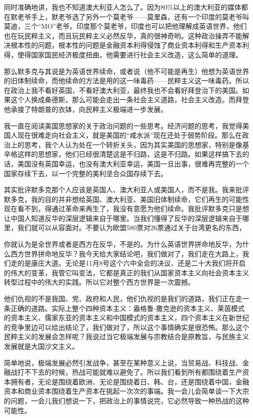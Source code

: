 \documentclass[UTF8, 12pt, a4paper]{ctexrep}
\begin{document}
同时准确地讲，我也不知道澳大利亚人怎么了。因为80\%以上的澳大利亚的媒体都在默老爷手上，默老爷选了另外一个莫老爷——莫里森，还有一个印度的莫老爷叫莫迪，三个“MO”老爷。印度那个莫老爷，印度也可以把他理解成英语世界，他们也在玩民粹主义，而且玩民粹主义必然反华，真的很神奇哟。这种政治操弄不能解决根本性的问题，根本性的问题是金融资本利得侵蚀了商业资本利得和生产资本利得，使得国家国民经济极度扭曲，他需要进行社会主义改造，这么简单的道理。

那么默多克与其说是为英语世界续命，或者说（他不可能是再生）他想为英语世界的旧体制续命，而他续命的方法是用的这一味毒药——民粹主义这一味毒药。所以在政治上我不看好英国，不看好澳大利亚，最终我也不会看好拜登治下的美国。如果这个人换成桑德斯，那么可能会走出一条社会主义道路，社会主义改造。而拜登他承接了特朗普的衣钵，向民粹主义极端进一步发展。

我一直在阅读美国思想家的关于政治问题的一些思考。经济问题的思考，我觉得美国人现在很难走向社会主义，就是美国的“咸水派”现在还处于弱势阶段。那么在政治上的思考，我个人认为处在一个转折关头，因为其实美国的思想家，特别是像基辛格这样的思想家，他们已经很清楚这是不归路，这是不归路。如果这样搞下去的话，美国没有英国幸运，也没有澳大利亚幸运，美国一旦出事，很难再完整的一个国家存续下去，以一个完整的美利坚合众国存续下去。

其实批评默多克那个人应该是英国人、澳大利亚人或美国人，而不是我。我来批评默多克，我的目的并非想给英国、澳大利亚、美国旧体制续命，它们再生的可能性现在看不到，得通过革命来再生了，我没有意愿为他们续命。我批评默多克只是想让中国人知道反华的深层逻辑来自于哪里。当我们懂得了反华的深层逻辑来自于哪里，我们就可以从容面对。不要认为欧盟580票对26票通过关于台湾更名的东西，

你就认为是全世界或者是西方在反华，不是的。为什么英语世界拼命地反华，为什么西方世界拼命地反华？我今天给大家结论吧，我们做对了，我们走在大路上，我们走的是康庄大道。无论是11月8号这个六中全会的决议、还是二十大我们将开启的伟大的变革，我管它叫变法，它都是真正的我们从国家资本主义向社会资本主义转型过程中的伟大的实践。所以它对整个西方世界是一次震撼。

他们仇视的不是我国、党、政府和人民，他们仇视的是我们的道路，我们正在走一条正确的道路。实际上整个四种资本主义：盎格鲁-撒克逊的资本主义、莱茵模式的资本主义、儒家东亚的资本主义和中国模式的资本主义，四个资本主义在新世纪的竞争里边可以给出结论了，我们做对了，所以这个事情确实是很恐怖。那么这个民粹主义的发展会怎样呢？我说过当它极端发展与宗教结合是原教旨，与民族主义发展就是大国沙文主义。

简单地说，极端发展必然引发战争，甚至在某种意义上说，当贸易战、科技战、金融战打不下去的时候，热战可能就难以避免了。所以我们看到所有都围绕着生产资本拥有者，无论是围绕着欧洲、无论是围绕着日、韩、台，还是围绕着中国，金融资本和商业资本围绕着生产资本在挑起一次次的事端。我一会儿会简单谈一下大宗的问题，一会儿我们想说一下，把政治上的事情说完，它必然导致一种热战的这种可能性。
\end{document}
